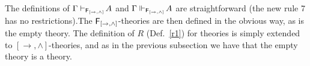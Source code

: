 \documentclass[12pt]{article}
\newtheorem{prop}[thm]{Proposition}
\newtheorem{dfn}[thm]{Definition}
\begin{document}
\noindent The definitions of $\Gamma\vdash_{{\sf F_{[\rightarrow, \wedge]}} }\!A$ and $\Gamma\Vdash_{{\sf F_{[\rightarrow, \wedge]}} }\! A$ are straightforward (the new rule 7 has no restrictions).The ${\sf F}_{[\rightarrow, \wedge]}$-theories are then defined in the obvious way, as is the empty theory.
The definition of $R$ (Def.\ \ref{r1}) for theories is simply extended to  ${[\rightarrow, \wedge]}$-theories, and as in the previous subsection we have that the empty theory is a theory.






\end{document}
